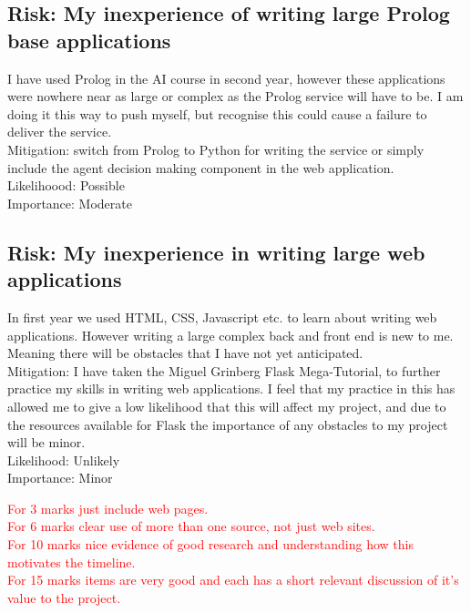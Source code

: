 \documentclass{article}
\begin{document}
\subsection*{Risk: My inexperience of writing large Prolog base applications}
I have used Prolog in the AI course in second year, however these applications were nowhere near as large or complex as the Prolog service will have to be. I am doing it this way to push myself, but recognise this could cause a failure to deliver the service.\\
Mitigation: switch from Prolog to Python for writing the service or simply include the agent decision making component in the web application.\\
Likelihoood: Possible\\
Importance: Moderate

\subsection*{Risk: My inexperience in writing large web applications}
In first year we used HTML, CSS, Javascript etc. to learn about writing web applications. However writing a large complex back and front end is new to me. Meaning there will be obstacles that I have not yet anticipated. \\
Mitigation: I have taken the Miguel Grinberg Flask Mega-Tutorial, to further practice my skills in writing web applications. I feel that my practice in this has allowed me to give a low likelihood that this will affect my project, and due to the resources available for Flask the importance of any obstacles to my project will be minor.\\
Likelihood: Unlikely\\
Importance: Minor
{}

\textcolor{red}{For 3 marks just include web pages.\\For 6 marks clear use of more than one source, not just web sites.\\For 10 marks nice evidence of good research and understanding how this motivates the timeline.\\For 15 marks items are very good and each has a short relevant discussion of it's value to the project.}
\end{document}

